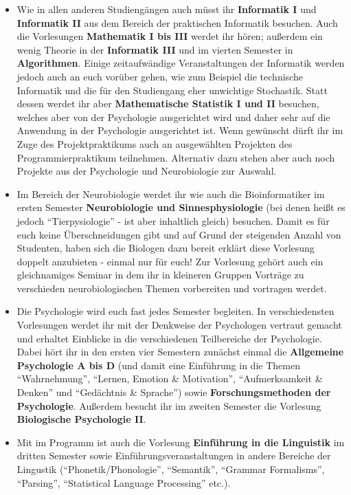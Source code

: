 \begin{itemize}

\item Wie in allen anderen Studiengängen auch müsst ihr \textbf{Informatik I}
    und \textbf{Informatik II} aus dem Bereich der praktischen Informatik
    besuchen. Auch die Vorlesungen \textbf{Mathematik I bis III} werdet ihr
    h\"oren; au\ss{}erdem ein wenig Theorie in der \textbf{Informatik III}
    und im vierten Semester in \textbf{Algorithmen}. Einige zeitaufwändige
    Veranstaltungen der Informatik werden jedoch auch an euch vorüber gehen, wie
    zum Beispiel die technische Informatik und die für den Studiengang eher
    unwichtige Stochastik. Statt dessen werdet ihr aber \textbf{Mathematische 
    Statistik I und II} besuchen, welches aber von der Psychologie ausgerichtet 
    wird und daher sehr auf die Anwendung in der Psychologie ausgerichtet 
    ist. Wenn gewünscht dürft ihr im Zuge des Projektpraktikums auch an 
    ausgewählten Projekten des Programmierpraktikum teilnehmen. Alternativ dazu 
    stehen aber auch noch Projekte aus der Psychologie und Neurobiologie zur 
    Auswahl.

\item Im Bereich der Neurobiologie werdet ihr wie auch die Bioinformatiker im 
ersten Semester \textbf{Neurobiologie und Sinnesphysiologie} (bei denen heißt 
es jedoch "`Tierpysiologie"' - ist aber inhaltlich gleich) besuchen. Damit es 
für euch keine Überschneidungen gibt und auf Grund der steigenden Anzahl von 
Studenten, haben sich die Biologen dazu bereit erklärt diese Vorlesung doppelt 
anzubieten - einmal nur für euch! Zur Vorlesung gehört auch ein gleichnamiges 
Seminar in dem ihr in kleineren Gruppen Vorträge zu verschieden 
neurobiologischen Themen vorbereiten und vortragen werdet.

\item Die Psychologie wird euch fast jedes Semester begleiten. In 
verschiedensten Vorlesungen werdet ihr mit der Denkweise der Psychologen 
vertraut gemacht und erhaltet Einblicke in die verschiedenen Teilbereiche der 
Psychologie. Dabei h\"ort ihr in den ersten vier Semestern zunächst einmal 
die \textbf{Allgemeine Psychologie A bis D} (und damit eine Einf\"uhrung in die 
Themen "`Wahrnehmung"', "`Lernen, Emotion \& Motivation"', "`Aufmerksamkeit \& 
Denken"' und "`Gedächtnis \& Sprache"') sowie \textbf{Forschungsmethoden der 
Psychologie}. Au\ss{}erdem besucht ihr im zweiten Semester die Vorlesung 
\textbf{Biologische Psychologie II}.

\item Mit im Programm ist auch die Vorlesung \textbf{Einführung in die 
Linguistik} im dritten Semester sowie Einf\"uhrungsveranstaltungen in andere 
Bereiche der Lingustik ("`Phonetik/Phonologie"', "`Semantik"', "`Grammar 
Formalisms"', "`Parsing"', "`Statistical Language Processing"' etc.).


\end{itemize}
